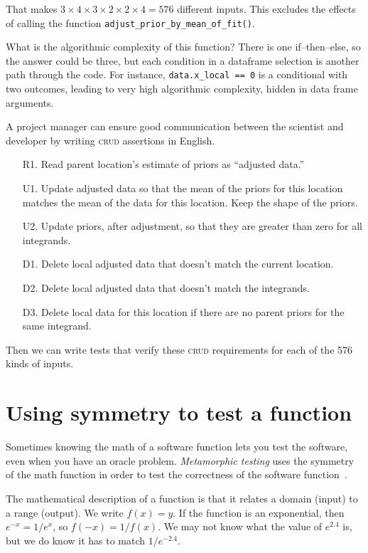 \documentclass[fleqn,10pt]{olplainarticle}
\begin{document}
\noindent{}That makes $3\times 4 \times 3\times 2\times 2\times 4=576$ different inputs.
This excludes the effects of calling the function
\lstinline!adjust_prior_by_mean_of_fit()!.

What is the algorithmic complexity of this function? There is one
if--then--else, so the answer could be three, but each condition in a dataframe
selection is another path through the code. For instance,
\lstinline!data.x_local == 0! is a conditional with two outcomes, leading
to very high algorithmic complexity, hidden in data frame arguments.

A project manager can ensure good communication between the scientist and
developer by writing \textsc{crud} assertions in English.
\begin{itemize}
    \item[R1.] Read parent location's estimate of priors as ``adjusted data.''
    \item[U1.] Update adjusted data so that the mean of the priors for this location matches
        the mean of the data for this location. Keep the shape of the priors.
    \item[U2.] Update priors, after adjustment, so that they are greater
        than zero for all integrands.
    \item[D1.] Delete local adjusted data that doesn't match the current location.
    \item[D2.] Delete local adjusted data that doesn't match the integrands.
    \item[D3.] Delete local data for this location if there are no parent
        priors for the same integrand.
\end{itemize}
Then we can write tests that verify these \textsc{crud} requirements for
each of the 576 kinds of inputs.



\section{Using symmetry to test a function}\label{sec:symmetry-test}

Sometimes knowing the math of a software function lets you
test the software, even when you have an oracle problem.
\emph{Metamorphic testing} uses the symmetry of the math function
in order to test the correctness of the software function~\citep{ding2016,guderlei2007,kanewala2015,liu2014}.

The mathematical description of a function is that it relates
a domain (input) to a range (output). We write $f(x) = y$.
If the function is an exponential, then $e^{-x} = 1 / e^x$,
so $f(-x) = 1 / f(x)$. We may not know what the value of
$e^{2.4}$ is, but we do know it has to match $1 / e^{-2.4}$.
\end{document}
